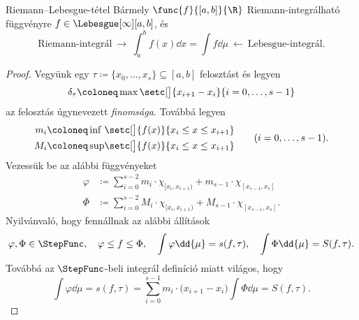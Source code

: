 \documentclass[
]{elteikthesis}[2024/04/26]
\begin{document}
	\begin{theorem}{Riemann--Lebesgue-tétel}{}
		Bármely \( \func{f}{[a, b]}{\R} \) Riemann-integrálható függvényre
		\( f \in \Lebesgue[\infty][a, b] \), és
		\[
			\text{Riemann-integrál} \ \longrightarrow \
			\int_a^b f(x) \dd{x} = \int f \dd{\mu}
			\ \longleftarrow \ \text{Lebesgue-integrál}.
		\]
	\end{theorem}
	\begin{proof}
		Vegyünk egy \( \tau \coloneq \{ x_0, \dots, x_s \} \subseteq [a, b] \) felosztást és legyen
		\[
			\delta_\tau \coloneq \max \setc[\big]{ x_{i + 1} - x_i }{ i = 0,\dots, s-1 }
		\]
		az felosztás úgynevezett \emph{finomsága}. Továbbá legyen
		\[
			\begin{alignedat}{2}
				m_i &\coloneq \inf && \setc[\big]{ f(x) }{ x_i \leq x \leq x_{i + 1} } \\
				M_i &\coloneq \sup && \setc[\big]{ f(x) }{ x_i \leq x \leq x_{i + 1} }
			\end{alignedat}
			\qquad (i = 0,\dots,s-1).
		\]
		Vezessük be az alábbi függvényeket
		\begin{align*}
			\varphi &\coloneq
			\sum_{i=0}^{s-2} m_i     {\cdot} \chi_{[x_i, x_{i+1})}
			+                m_{s-1} {\cdot} \chi_{[x_{s-1}, x_s]} \\[6pt]
			\Phi &\coloneq
			\sum_{i=0}^{s-2} M_i     {\cdot} \chi_{[x_i, x_{i+1})}
			+                M_{s-1} {\cdot} \chi_{[x_{s-1}, x_s]}.
		\end{align*}
		Nyilvánvaló, hogy fennállnak az alábbi állítások
		\[
			\varphi, \Phi \in \StepFunc, \quad
			\varphi \leq f \leq \Phi, \quad
			\int \varphi \dd{\mu} = s(f, \tau), \quad
			\int \Phi \dd{\mu} = S(f, \tau).
		\]
		Továbbá az \( \StepFunc \)-beli integrál definíció miatt világos, hogy
		\[
			\int \varphi \dd{\mu} = 
			s(f, \tau) = 
			\sum_{i=0}^{s-1} m_i {\cdot} \bigl( x_{i+1} - x_i \bigr)
			\int \Phi \dd{\mu} = S(f, \tau).
		\]
		

\end{proof}
\end{document}
